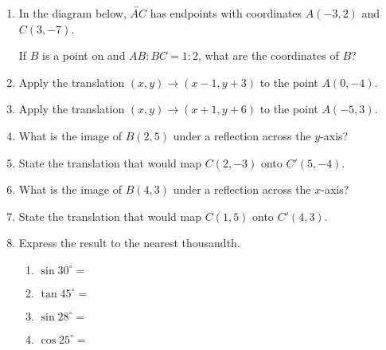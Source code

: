 \begin{enumerate}
\item In the diagram below, $\overleftrightarrow{AC}$ has endpoints with coordinates $A(-3,2)$ and $C(3, -7)$.
  \begin{center} %
  \end{center}
  If $B$ is a point on  and $AB {:} BC = 1{:}2$,  what  are  the  coordinates of $B$?

\newpage
\item Apply the translation $(x,y) \rightarrow (x-1,y+3)$ to the point $A(0,-4)$. \vspace{1cm}

\item Apply the translation $(x,y) \rightarrow (x+1,y+6)$ to the point $A(-5,3)$. \vspace{2cm}

\item What is the image of $B(2,5)$ under a reflection across the $y$-axis? \vspace{2cm}

\item State the translation that would map $C(2,-3)$ onto $C'(5,-4)$. \vspace{1cm}

\item What is the image of $B(4,3)$ under a reflection across the $x$-axis? \vspace{1cm}

\item State the translation that would map $C(1,5)$ onto $C'(4,3)$. \vspace{1cm}

\item Express the result to the nearest thousandth.  \vspace{0.5cm}
  \begin{multicols}{2}
    \begin{enumerate}
      \item $\sin 30^\circ = $ \vspace{0.5cm}
      \item $\tan 45^\circ =$
      \item $\sin 28^\circ = $ \vspace{0.5cm}
      \item $\cos 25^\circ =$
    \end{enumerate}
  \end{multicols}


\end{enumerate}
